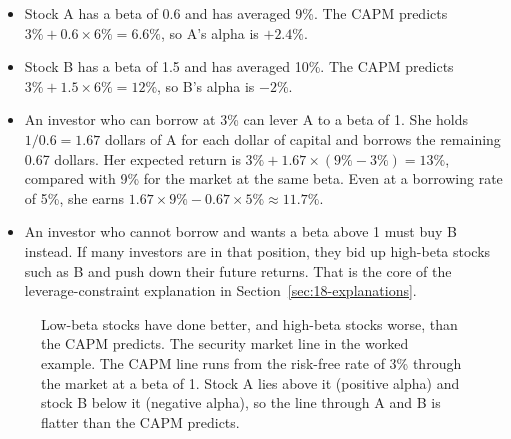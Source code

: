 \begin{itemize}
  \item Stock A has a beta of 0.6 and has averaged 9\%. The CAPM predicts $3\% + 0.6 \times 6\% = 6.6\%$, so A's alpha is $+2.4\%$.
  \item Stock B has a beta of 1.5 and has averaged 10\%. The CAPM predicts $3\% + 1.5 \times 6\% = 12\%$, so B's alpha is $-2\%$.
  \item An investor who can borrow at 3\% can lever A to a beta of 1. She holds $1/0.6 = 1.67$ dollars of A for each dollar of capital and borrows the remaining 0.67 dollars. Her expected return is $3\% + 1.67 \times (9\% - 3\%) = 13\%$, compared with 9\% for the market at the same beta. Even at a borrowing rate of 5\%, she earns $1.67 \times 9\% - 0.67 \times 5\% \approx 11.7\%$.
  \item An investor who cannot borrow and wants a beta above 1 must buy B instead. If many investors are in that position, they bid up high-beta stocks such as B and push down their future returns. That is the core of the leverage-constraint explanation in Section~\ref{sec:18-explanations}.
\end{itemize}

\begin{figure}[htbp]
\centering
{}
\caption{Low-beta stocks have done better, and high-beta stocks worse, than the CAPM predicts. The security market line in the worked example. The CAPM line runs from the risk-free rate of 3\% through the market at a beta of 1. Stock A lies above it (positive alpha) and stock B below it (negative alpha), so the line through A and B is flatter than the CAPM predicts.}
\label{fig:18-sml}
\end{figure}

